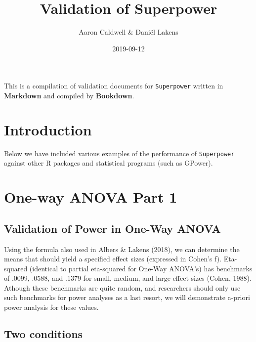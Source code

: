 \documentclass[]{book}
\title{Validation of Superpower}
\author{Aaron Caldwell \& Daniël Lakens}
\date{2019-09-12}
\begin{document}
\maketitle

{
\setcounter{tocdepth}{1}
\tableofcontents
}
This is a compilation of validation documents for \texttt{Superpower} written in \textbf{Markdown} and compiled by \textbf{Bookdown}.

\hypertarget{introduction}{%
\chapter{Introduction}\label{introduction}}

Below we have included various examples of the performance of \texttt{Superpower} against other R packages and statistical programs (such as GPower).

\hypertarget{intro}{%
\chapter{One-way ANOVA Part 1}\label{intro}}

\hypertarget{validation-of-power-in-one-way-anova}{%
\section{Validation of Power in One-Way ANOVA}\label{validation-of-power-in-one-way-anova}}

Using the formula also used in Albers \& Lakens (2018), we can determine the means that should yield a specified effect sizes (expressed in Cohen's f). Eta-squared (identical to partial eta-squared for One-Way ANOVA's) has benchmarks of .0099, .0588, and .1379 for small, medium, and large effect sizes (Cohen, 1988). Athough these benchmarks are quite random, and researchers should only use such benchmarks for power analyses as a last resort, we will demonstrate a-priori power analysis for these values.

\hypertarget{two-conditions}{%
\section{Two conditions}\label{two-conditions}}
\end{document}
